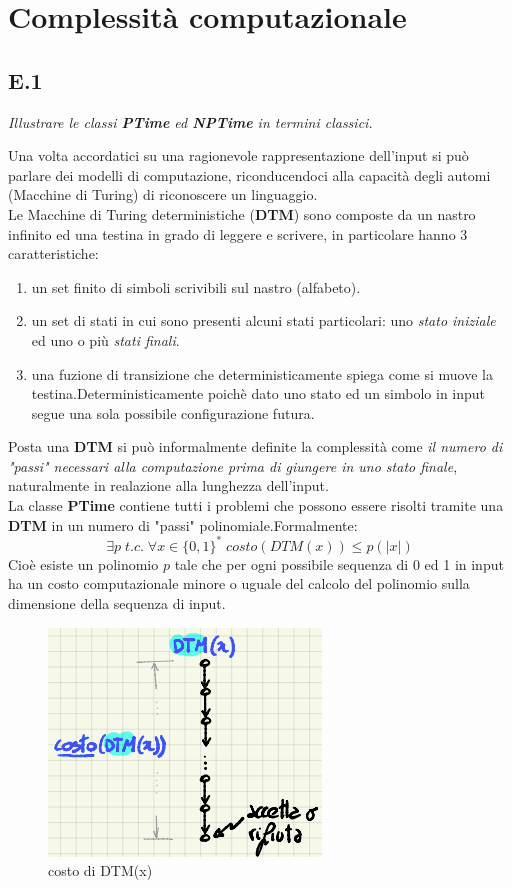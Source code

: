 \documentclass[a4paper]{article}
\begin{document}
\section{Complessità computazionale}
\subsection{E.1}
\emph{Illustrare le classi \textbf{PTime} ed \textbf{NPTime} in termini classici.}


Una volta accordatici su una ragionevole rappresentazione dell'input si può parlare dei modelli di computazione, riconducendoci alla capacità degli automi (Macchine di Turing) di riconoscere un linguaggio.\\
Le Macchine di Turing deterministiche (\textbf{DTM}) sono composte da un nastro infinito ed una testina in grado di leggere e scrivere, in particolare hanno 3 caratteristiche:
\begin{enumerate}
	\item un set finito di simboli scrivibili sul nastro (alfabeto).
	\item un set di stati in cui sono presenti alcuni stati particolari: uno \textit{stato iniziale} ed uno o più \textit{stati finali}.
	\item una fuzione di transizione che deterministicamente spiega come si muove la testina.Deterministicamente poichè dato uno stato ed un simbolo in input segue una sola possibile configurazione futura.
\end{enumerate}
Posta una \textbf{DTM} si può informalmente definite la complessità come \textit{il numero di "passi" necessari alla computazione prima di giungere in uno stato finale}, naturalmente in realazione alla lunghezza dell'input.\\
La classe \textbf{PTime} contiene tutti i problemi che possono essere risolti tramite una \textbf{DTM} in un numero di "passi" polinomiale.Formalmente: $$\exists p \; t.c. \; \forall x \in \{0,1\}^* \; costo(DTM(x)) \leq p(\lvert x \rvert)$$
Cioè esiste un polinomio $p$ tale che per ogni possibile sequenza di 0 ed 1 in input ha un costo computazionale minore o uguale del calcolo del polinomio sulla dimensione della sequenza di input.
\begin{figure}[!ht]
\centering
\includegraphics[scale = 0.5]{./img/E1_DTM.png}
\caption{costo di DTM(x)} \label{FIG:E1_DTM}
\end{figure}\\
\end{document}
